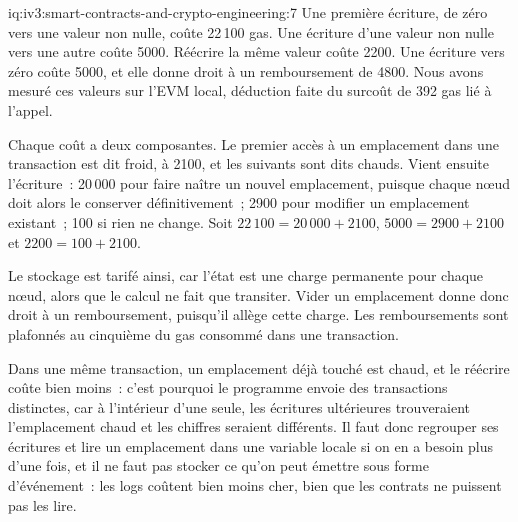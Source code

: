 \begin{solution}{iq:iv3:smart-contracts-and-crypto-engineering:7}
Une première écriture, de zéro vers une valeur non nulle, coûte 22\,100 gas. Une écriture d'une valeur non nulle vers une autre coûte 5000. Réécrire la même valeur coûte 2200. Une écriture vers zéro coûte 5000, et elle donne droit à un remboursement de 4800. Nous avons mesuré ces valeurs sur l'EVM local, déduction faite du surcoût de 392 gas lié à l'appel.

Chaque coût a deux composantes. Le premier accès à un emplacement dans une transaction est dit froid, à 2100, et les suivants sont dits chauds. Vient ensuite l'écriture~: 20\,000 pour faire naître un nouvel emplacement, puisque chaque nœud doit alors le conserver définitivement~; 2900 pour modifier un emplacement existant~; 100 si rien ne change. Soit $22\,100 = 20\,000 + 2100$, $5000 = 2900 + 2100$ et $2200 = 100 + 2100$.

Le stockage est tarifé ainsi, car l'état est une charge permanente pour chaque nœud, alors que le calcul ne fait que transiter. Vider un emplacement donne donc droit à un remboursement, puisqu'il allège cette charge. Les remboursements sont plafonnés au cinquième du gas consommé dans une transaction.

Dans une même transaction, un emplacement déjà touché est chaud, et le réécrire coûte bien moins~: c'est pourquoi le programme envoie des transactions distinctes, car à l'intérieur d'une seule, les écritures ultérieures trouveraient l'emplacement chaud et les chiffres seraient différents. Il faut donc regrouper ses écritures et lire un emplacement dans une variable locale si on en a besoin plus d'une fois, et il ne faut pas stocker ce qu'on peut émettre sous forme d'événement~: les logs coûtent bien moins cher, bien que les contrats ne puissent pas les lire.

\end{solution}

